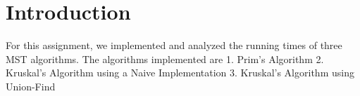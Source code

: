 \section{Introduction}
For this assignment, we implemented and analyzed the running times of three MST algorithms. The algorithms implemented are
1. Prim's Algorithm
2. Kruskal's Algorithm using a Naive Implementation
3. Kruskal's Algorithm using Union-Find

\pagebreak
